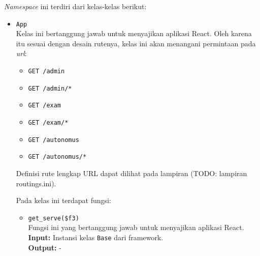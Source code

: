     \textit{Namespace} ini terdiri dari kelas-kelas berikut:
    \begin{itemize}
        \item \texttt{App} \\
            Kelas ini bertanggung jawab untuk menyajikan aplikasi React. Oleh karena itu
            sesuai dengan desain rutenya, kelas ini akan menangani permintaan pada \textit{url}:
            \begin{itemize}
                \item \texttt{GET /admin}
                \item \texttt{GET /admin/*}
                \item \texttt{GET /exam}
                \item \texttt{GET /exam/*}
                \item \texttt{GET /autonomus}
                \item \texttt{GET /autonomus/*}
            \end{itemize}
            Definisi rute lengkap URL dapat dilihat pada lampiran (TODO: lampiran routings.ini).
            
            Pada kelas ini terdapat fungsi:
            \begin{itemize}
                \item \texttt{get\_serve(\$f3)} \\
                    Fungsi ini yang bertanggung jawab untuk menyajikan aplikasi React.\\
                    \textbf{Input:} Instansi kelas \texttt{Base} dari framework. \\
                    \textbf{Output:} -
            \end{itemize}
        

\end{itemize}
